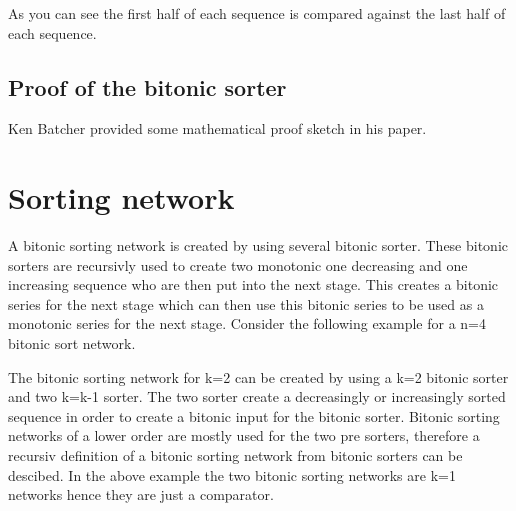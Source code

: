 \documentclass{article}
\newcommand{\compareBlock}[2][]{
    \pgfkeys{/compareBlock, default, #1}%
    \coordinate (\cbName_a) at ($(0, 1.33) + #2$);
    \coordinate (\cbName_b) at ($(0, 0.66) + #2$);
    \coordinate (\cbName_l) at ($(1.5, 0.66) + #2$);
    \coordinate (\cbName_h) at ($(1.5, 1.33) + #2$);

    \draw[color=\cbCA] (\cbName_a) -- ++(0.2, 0)node[anchor=west]{\cbA};
    \draw[color=\cbCB] (\cbName_b) -- ++(0.2, 0)node[anchor=west]{\cbB};
    \draw[color=\cbCL] (\cbName_l) -- ++(-0.2, 0)node[anchor=east]{\cbL};
    \draw[color=\cbCH] (\cbName_h) -- ++(-0.2, 0)node[anchor=east]{\cbH};
    \draw[draw=black] #2 rectangle ++(1.5,2);
}
\newcommand{\connectCB}[3]{
    \draw[color=#3] (#1) -- (#2);
}
\newcommand{\outputCB}[3]{
    \coordinate (#2) at ($(#1_h) + (0.25, 0)$);
    \coordinate (#3) at ($(#1_l) + (0.25, 0)$);
    \node at (#2) [anchor=west]{#2};
    \node at (#3) [anchor=west]{#3};
    \connectCB{#2}{#1_h}{black}
    \connectCB{#3}{#1_l}{black}
}
\begin{document}
As you can see the first half of each sequence is compared against the last half of each sequence. 

\subsection{Proof of the bitonic sorter}

Ken Batcher provided some mathematical proof sketch in his paper.

\section{Sorting network}

A bitonic sorting network is created by using several bitonic sorter. 
These bitonic sorters are recursivly used to create two monotonic one decreasing and one increasing sequence who are then put into the next stage.
This creates a bitonic series for the next stage which can then use this bitonic series to be used as a monotonic series for the next stage.
Consider the following example for a n=4 bitonic sort network.


The bitonic sorting network for k=2 can be created by using a k=2 bitonic sorter and two k=k-1 sorter.
The two sorter create a decreasingly or increasingly sorted sequence in order to create a bitonic input for the bitonic sorter.
Bitonic sorting networks of a lower order are mostly used for the two pre sorters, therefore a recursiv definition of a bitonic sorting network from bitonic sorters can be descibed.
In the above example the two bitonic sorting networks are k=1 networks hence they are just a comparator.
\end{document}

